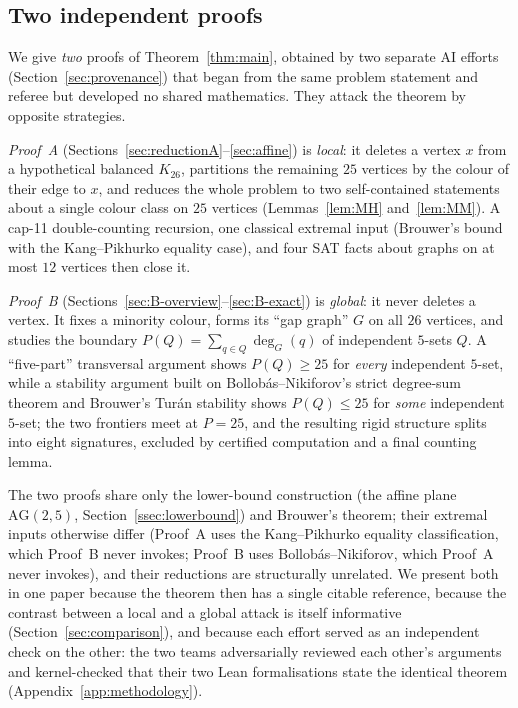 \documentclass[11pt,reqno]{amsart}
\theoremstyle{definition}
\theoremstyle{remark}
\newcommand{\capeleven}{\textsf{cap-11}}
\begin{document}
\subsection{Two independent proofs}\label{ssec:two-proofs}
We give \emph{two} proofs of Theorem~\ref{thm:main}, obtained by two separate AI
efforts (Section~\ref{sec:provenance}) that began from the same problem statement and
referee but developed no shared mathematics. They attack the theorem by opposite
strategies.

\emph{Proof~A} (Sections~\ref{sec:reductionA}--\ref{sec:affine}) is \emph{local}: it
deletes a vertex $x$ from a hypothetical balanced $K_{26}$, partitions the remaining
$25$ vertices by the colour of their edge to $x$, and reduces the whole problem to two
self-contained statements about a single colour class on $25$ vertices
(Lemmas~\ref{lem:MH} and~\ref{lem:MM}). A \capeleven{} double-counting recursion, one
classical extremal input (Brouwer's bound with the Kang--Pikhurko equality case), and
four SAT facts about graphs on at most $12$ vertices then close it.

\emph{Proof~B} (Sections~\ref{sec:B-overview}--\ref{sec:B-exact}) is \emph{global}: it
never deletes a vertex. It fixes a minority colour, forms its ``gap graph'' $G$ on all
$26$ vertices, and studies the boundary $P(Q)=\sum_{q\in Q}\deg_G(q)$ of independent
$5$-sets $Q$. A ``five-part'' transversal argument shows $P(Q)\ge 25$ for \emph{every}
independent $5$-set, while a stability argument built on Bollob\'as--Nikiforov's strict
degree-sum theorem and Brouwer's Tur\'an stability shows $P(Q)\le 25$ for \emph{some}
independent $5$-set; the two frontiers meet at $P=25$, and the resulting rigid structure
splits into eight signatures, excluded by certified computation and a final counting
lemma.

The two proofs share only the lower-bound construction (the affine plane
$\mathrm{AG}(2,5)$, Section~\ref{ssec:lowerbound}) and Brouwer's theorem; their extremal
inputs otherwise differ (Proof~A uses the Kang--Pikhurko equality classification, which
Proof~B never invokes; Proof~B uses Bollob\'as--Nikiforov, which Proof~A never invokes),
and their reductions are structurally unrelated. We present both in one paper because
the theorem then has a single citable reference, because the contrast between a local
and a global attack is itself informative (Section~\ref{sec:comparison}), and because
each effort served as an independent check on the other: the two teams adversarially
reviewed each other's arguments and kernel-checked that their two Lean formalisations
state the identical theorem (Appendix~\ref{app:methodology}).
\end{document}

